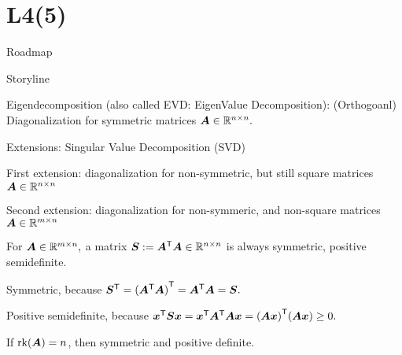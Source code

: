 \documentclass[fleqn,aspectratio=169]{beamer}
\begin{document}
\section{L4(5)}
\begin{frame}{Roadmap}

\plitemsep 0.1in

\bce[(1)] 
\item {}

\item {}

\item {}

\item {}

\item {}

\item {}

\ece
\end{frame}

\begin{frame}{Storyline}

\plitemsep 0.1in

\bci 
\item Eigendecomposition (also called EVD: EigenValue Decomposition): (Orthogoanl) Diagonalization for symmetric matrices $\bm{A} \in {\mathbb R}^{n \times n}.$


\item Extensions: Singular Value Decomposition (SVD)
\bce
\item First extension: diagonalization for non-symmetric, but still square matrices $\bm{A} \in {\mathbb R}^{n \times n}$
\item Second extension: diagonalization for non-symmeric, and non-square matrices $\bm{A} \in {\mathbb R}^{m \times n}$
\ece

\medskip
\item {} For $\bm{A} \in {\mathbb R}^{m \times n},$ a matrix $\bm{S} := {\bm{A}}^{\mathsf{T}} \bm{A} \in {\mathbb R}^{n \times n}$ is always symmetric, positive semidefinite. 
\bci
\item Symmetric, because ${\bm{S}}^{\mathsf{T}} = {({\bm{A}}^{\mathsf{T}} \bm{A})}^{\mathsf{T}} = {\bm{A}}^{\mathsf{T}} \bm{A} = \bm{S}.$
\item Positive semidefinite, because ${\bm{x}}^{\mathsf{T}} \bm{S} \bm{x} = {\bm{x}}^{\mathsf{T}} {\bm{A}}^{\mathsf{T}}\bm{A} \bm{x} = {(\bm{A} \bm{x})}^{\mathsf{T}} (\bm{A} \bm{x}) \ge 0.$

\item If $\text{rk}(\bm{A}) = n$, then symmetric and positive definite. 
\eci

\eci
\end{frame}
\end{document}
